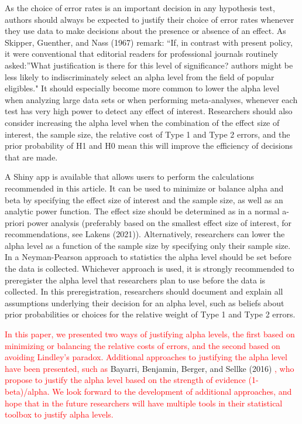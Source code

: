 \documentclass[
  english,
  ,man, a4paper,floatsintext]{apa6}
\begin{document}
As the choice of error rates is an important decision in any hypothesis test, authors should always be expected to justify their choice of error rates whenever they use data to make decisions about the presence or absence of an effect. As Skipper, Guenther, and Nass (1967) remark: ``If, in contrast with present policy, it were conventional that editorial readers for professional journals routinely asked:''What justification is there for this level of significance? authors might be less likely to indiscriminately select an alpha level from the field of popular eligibles." It should especially become more common to lower the alpha level when analyzing large data sets or when performing meta-analyses, whenever each test has very high power to detect any effect of interest. Researchers should also consider increasing the alpha level when the combination of the effect size of interest, the sample size, the relative cost of Type 1 and Type 2 errors, and the prior probability of H1 and H0 mean this will improve the efficiency of decisions that are made.

A Shiny app is available that allows users to perform the calculations recommended in this article. It can be used to minimize or balance alpha and beta by specifying the effect size of interest and the sample size, as well as an analytic power function. The effect size should be determined as in a normal a-priori power analysis (preferably based on the smallest effect size of interest, for recommendations, see Lakens (2021)). Alternatively, researchers can lower the alpha level as a function of the sample size by specifying only their sample size. In a Neyman-Pearson approach to statistics the alpha level should be set before the data is collected. Whichever approach is used, it is strongly recommended to preregister the alpha level that researchers plan to use before the data is collected. In this preregistration, researchers should document and explain all assumptions underlying their decision for an alpha level, such as beliefs about prior probabilities or choices for the relative weight of Type 1 and Type 2 errors.

\textcolor{red}{In this paper, we presented two ways of justifying alpha levels, the first based on minimizing or balancing the relative costs of errors, and the second based on avoiding Lindley's paradox. Additional approaches to justifying the alpha level have been presented, such as}
Bayarri, Benjamin, Berger, and Sellke (2016)
\textcolor{red}{, who propose to justify the alpha level based on the strength of evidence (1-beta)/alpha. We look forward to the development of additional approaches, and hope that in the future researchers will have multiple tools in their statistical toolbox to justify alpha levels.}
\end{document}
